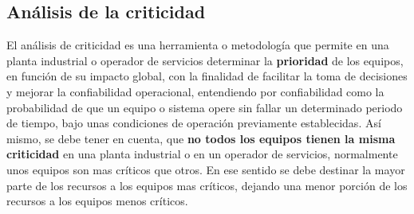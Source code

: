 \documentclass[
	12pt, %
	fleqn, %
	a4paper, %
	oneside, %
]{LegrandOrangeBook}
\begin{document}
\subsection{Análisis de la criticidad}
El análisis de criticidad es una herramienta o metodología que permite en una planta industrial o operador de servicios determinar la \textbf{prioridad} de los equipos, en función de su impacto global, con la finalidad de facilitar la toma de decisiones y mejorar la confiabilidad operacional, entendiendo por confiabilidad como la probabilidad de que un equipo o sistema opere sin fallar un determinado periodo de tiempo, bajo unas condiciones de operación previamente establecidas. Así mismo, se debe tener en cuenta, que \textbf{no todos los equipos tienen la misma criticidad} en una planta industrial o en un operador de servicios, normalmente unos equipos son mas críticos que otros. En ese sentido se debe destinar la mayor parte de los recursos a los equipos mas críticos, dejando una menor porción de los recursos a los equipos menos críticos.
\end{document}
